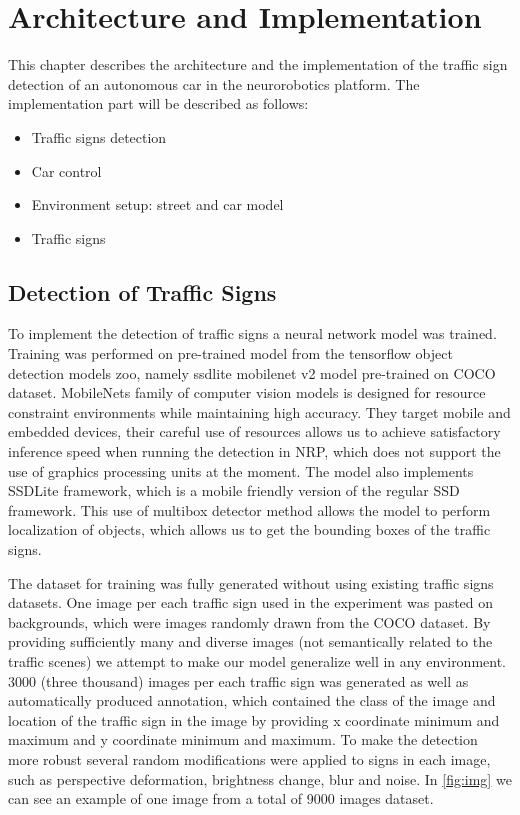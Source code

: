
\section{Architecture and Implementation}

This chapter describes the architecture and the implementation of the traffic sign detection of an autonomous car in the neurorobotics platform. The implementation part will be described as follows: 
\begin{itemize}
	\item Traffic signs detection
	\item Car control
	\item Environment setup: street and car model
	\item Traffic signs 
\end{itemize}

\subsection{Detection of Traffic Signs}

To implement the detection of traffic signs a neural network model was trained. Training was performed on pre-trained model from the tensorflow object detection models zoo, namely ssdlite mobilenet v2 model pre-trained on COCO dataset\cite{DBLP:journals/corr/HuangRSZKFFWSG016}. MobileNets family of computer vision models is designed for resource constraint environments while maintaining high accuracy. They target mobile and embedded devices, their careful use of resources allows us to achieve satisfactory inference speed when running the detection in NRP, which does not support the use of graphics processing units at the moment. The model also implements SSDLite framework, which is a mobile friendly version of the regular SSD framework\cite{DBLP:journals/corr/abs-1801-04381}. This use of multibox detector method allows the model to perform localization of objects, which allows us to get the bounding boxes of the traffic signs. 


The dataset for training was fully generated without using existing traffic signs datasets. One image per each traffic sign used in the experiment was pasted on backgrounds, which were images randomly drawn from the COCO dataset. By providing sufficiently many and diverse images (not semantically related to the traffic scenes) we attempt to make our model generalize well in any environment. 3000 (three thousand) images per each traffic sign was generated as well as automatically produced annotation, which contained the class of the image and location of the traffic sign in the image by providing x coordinate minimum and maximum and y coordinate minimum and maximum. To make the detection more robust several random modifications were applied to signs in each image, such as perspective deformation, brightness change, blur and noise. In \ref{fig:img} we can see an example of one image from a total of 9000 images dataset.

